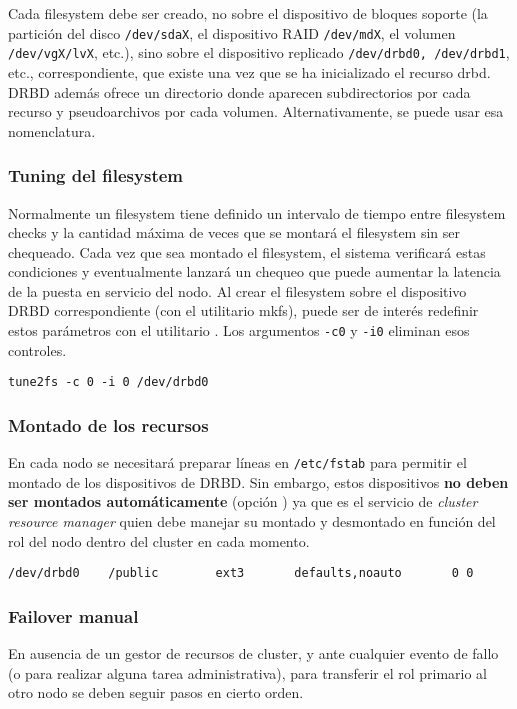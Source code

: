 Cada filesystem debe ser creado, no sobre el dispositivo de bloques soporte (la partición del disco \texttt{/dev/sdaX}, el dispositivo RAID \texttt{/dev/mdX}, el volumen \texttt{/dev/vgX/lvX}, etc.), sino sobre el dispositivo replicado \texttt{/dev/drbd0, /dev/drbd1}, etc., correspondiente, que existe una vez que se ha inicializado el recurso drbd. DRBD además ofrece un directorio  donde aparecen subdirectorios por cada recurso y pseudoarchivos por cada volumen. Alternativamente, se puede usar esa nomenclatura. 

\subsubsection{Tuning del filesystem}
Normalmente un filesystem tiene definido un intervalo de tiempo entre filesystem checks y la cantidad máxima de veces que se montará el filesystem sin ser chequeado. Cada vez que sea montado el filesystem, el sistema verificará estas condiciones y eventualmente lanzará un chequeo que puede aumentar la latencia de la puesta en servicio del nodo. Al crear el filesystem sobre el dispositivo DRBD correspondiente (con el utilitario mkfs), puede ser de interés redefinir estos parámetros con el utilitario . Los argumentos \texttt{-c0} y \texttt{-i0} eliminan esos controles. 

\begin{lstlisting}
tune2fs -c 0 -i 0 /dev/drbd0
\end{lstlisting}

\subsubsection{Montado de los recursos}
En cada nodo se necesitará preparar líneas en \texttt{/etc/fstab} para permitir el montado de los dispositivos de DRBD. Sin embargo, estos dispositivos \textbf{no deben ser montados automáticamente} (opción ) ya que es el servicio de \textit{cluster resource manager} quien debe manejar su montado y desmontado en función del rol del nodo dentro del cluster en cada momento.

\begin{lstlisting}
/dev/drbd0    /public        ext3       defaults,noauto       0 0
\end{lstlisting}

\subsubsection{Failover manual}
En ausencia de un gestor de recursos de cluster, y ante cualquier evento de fallo (o para realizar alguna tarea administrativa), para transferir el rol primario al otro nodo se deben seguir pasos en cierto orden. 

